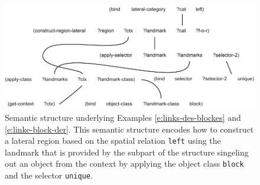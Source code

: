 \begin{figure}
\begin{center}
\includegraphics[width=1.0\columnwidth]{figs/semantic-structure-links-des-blockes}
\end{center}
\caption[Semantic structure example lateral region with landmark]{
Semantic structure underlying Examples \ref{e:links-des-blockes}
and \ref{e:linke-block-der}. This semantic structure encodes how to construct
a lateral region based on the spatial relation {\footnotesize\tt left} using the landmark 
that is provided by the subpart of the structure singeling out an object from the context
by applying the object class {\footnotesize\tt block} and the selector {\footnotesize\tt unique}.}
\label{f:semantic-structure-2}
\end{figure}
